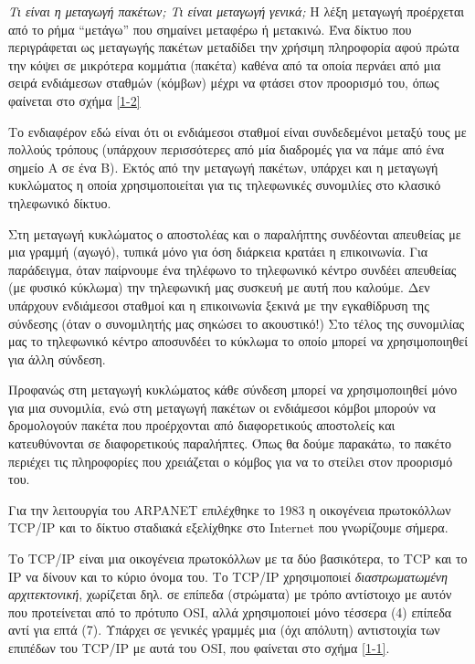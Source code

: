 \begin{inthebox}
\emph{Τι είναι η μεταγωγή πακέτων; Τι είναι μεταγωγή γενικά;}
Η λέξη μεταγωγή προέρχεται από το ρήμα ``μετάγω'' που σημαίνει μεταφέρω ή μετακινώ.
Ένα δίκτυο που περιγράφεται ως μεταγωγής πακέτων μεταδίδει την χρήσιμη πληροφορία αφού πρώτα
την κόψει σε μικρότερα κομμάτια (πακέτα) καθένα από τα οποία περνάει από μια σειρά ενδιάμεσων σταθμών
(κόμβων) μέχρι να φτάσει στον προορισμό του, όπως φαίνεται στο σχήμα \ref{1-2}

Το ενδιαφέρον εδώ είναι ότι οι ενδιάμεσοι σταθμοί είναι συνδεδεμένοι μεταξύ τους
με πολλούς τρόπους (υπάρχουν περισσότερες από μία διαδρομές για να πάμε από
ένα σημείο Α σε ένα Β). Εκτός από την μεταγωγή πακέτων, υπάρχει και η μεταγωγή
κυκλώματος η οποία χρησιμοποιείται για τις τηλεφωνικές συνομιλίες στο κλασικό
τηλεφωνικό δίκτυο.

Στη μεταγωγή κυκλώματος ο αποστολέας και ο παραλήπτης συνδέονται απευθείας με
μια γραμμή (αγωγό), τυπικά μόνο για όση διάρκεια κρατάει η επικοινωνία. Για
παράδειγμα, όταν παίρνουμε ένα τηλέφωνο το τηλεφωνικό κέντρο συνδέει απευθείας
(με φυσικό κύκλωμα) την τηλεφωνική μας συσκευή με αυτή που καλούμε. Δεν
υπάρχουν ενδιάμεσοι σταθμοί και η επικοινωνία ξεκινά με την εγκαθίδρυση της
σύνδεσης (όταν ο συνομιλητής μας σηκώσει το ακουστικό!) Στο τέλος της
συνομιλίας μας το τηλεφωνικό κέντρο αποσυνδέει το κύκλωμα το οποίο μπορεί να
χρησιμοποιηθεί για άλλη σύνδεση.

Προφανώς στη μεταγωγή κυκλώματος κάθε σύνδεση μπορεί να χρησιμοποιηθεί μόνο
για μια συνομιλία, ενώ στη μεταγωγή πακέτων οι ενδιάμεσοι κόμβοι μπορούν να
δρομολογούν πακέτα που προέρχονται από διαφορετικούς αποστολείς και
κατευθύνονται σε διαφορετικούς παραλήπτες. Όπως θα δούμε παρακάτω, το πακέτο
περιέχει τις πληροφορίες που χρειάζεται ο κόμβος για να το στείλει στον
προορισμό του.
\end{inthebox}

Για την λειτουργία του ARPANET επιλέχθηκε το 1983 η οικογένεια πρωτοκόλλων
TCP/IP και το δίκτυο σταδιακά εξελίχθηκε στο Internet που γνωρίζουμε σήμερα.

Το TCP/IP είναι μια οικογένεια πρωτοκόλλων με τα δύο βασικότερα, το TCP και το
IP να δίνουν και το κύριο όνομα του. Το TCP/IP χρησιμοποιεί \emph{διαστρωματωμένη
αρχιτεκτονική}, χωρίζεται δηλ. σε επίπεδα (στρώματα) με τρόπο αντίστοιχο με
αυτόν που προτείνεται από το πρότυπο OSI, αλλά χρησιμοποιεί μόνο τέσσερα (4)
επίπεδα αντί για επτά (7). Υπάρχει σε γενικές γραμμές μια (όχι απόλυτη) αντιστοιχία
των επιπέδων του TCP/IP με αυτά του OSI, που φαίνεται στο σχήμα \ref{1-1}.

